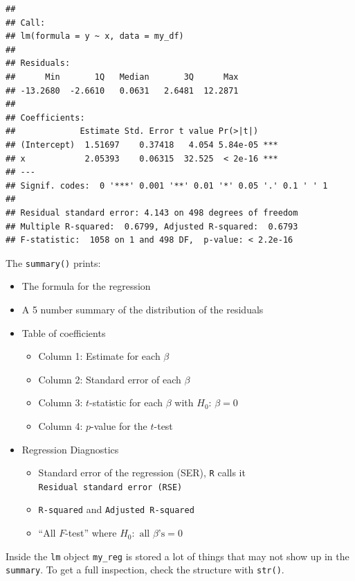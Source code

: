 \documentclass[]{book}
\providecommand{\tightlist}{%
  \setlength{\itemsep}{0pt}\setlength{\parskip}{0pt}}
\theoremstyle{definition}
\theoremstyle{definition}
\theoremstyle{definition}
\theoremstyle{remark}
\begin{document}
\begin{verbatim}
## 
## Call:
## lm(formula = y ~ x, data = my_df)
## 
## Residuals:
##      Min       1Q   Median       3Q      Max 
## -13.2680  -2.6610   0.0631   2.6481  12.2871 
## 
## Coefficients:
##             Estimate Std. Error t value Pr(>|t|)    
## (Intercept)  1.51697    0.37418   4.054 5.84e-05 ***
## x            2.05393    0.06315  32.525  < 2e-16 ***
## ---
## Signif. codes:  0 '***' 0.001 '**' 0.01 '*' 0.05 '.' 0.1 ' ' 1
## 
## Residual standard error: 4.143 on 498 degrees of freedom
## Multiple R-squared:  0.6799, Adjusted R-squared:  0.6793 
## F-statistic:  1058 on 1 and 498 DF,  p-value: < 2.2e-16
\end{verbatim}

The \texttt{summary()} prints:

\begin{itemize}
\tightlist
\item
  The formula for the regression
\item
  A 5 number summary of the distribution of the residuals
\item
  Table of coefficients

  \begin{itemize}
  \tightlist
  \item
    Column 1: Estimate for each \(\beta\)
  \item
    Column 2: Standard error of each \(\beta\)
  \item
    Column 3: \(t\)-statistic for each \(\beta\) with
    \(H_0: \, \beta=0\)
  \item
    Column 4: \(p\)-value for the \(t\)-test
  \end{itemize}
\item
  Regression Diagnostics

  \begin{itemize}
  \tightlist
  \item
    Standard error of the regression (SER), \texttt{R} calls it
    \texttt{Residual\ standard\ error\ (RSE)}
  \item
    \texttt{R-squared} and \texttt{Adjusted\ R-squared}
  \item
    ``All \(F\)-test'' where \(H_0: \text{ all } \beta\text{'s}=0\)
  \end{itemize}
\end{itemize}

Inside the \texttt{lm} object \texttt{my\_reg} is stored a lot of things
that may not show up in the \texttt{summary}. To get a full inspection,
check the structure with \texttt{str()}.
\end{document}
